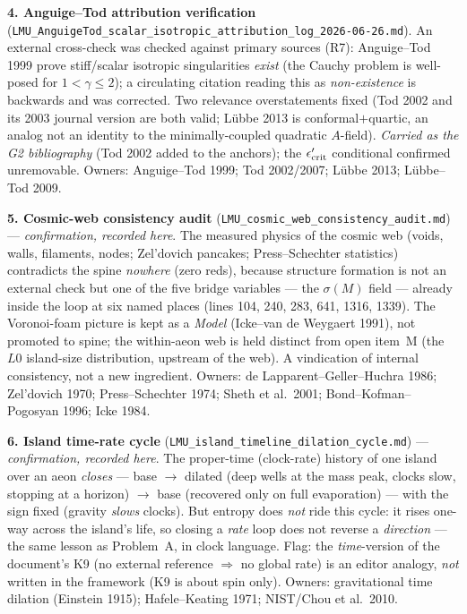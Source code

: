\documentclass[11pt]{article}
\begin{document}
\smallskip\noindent\textbf{4. Anguige--Tod attribution verification} (\texttt{LMU\_AnguigeTod\_scalar\_isotropic\_attribution\_log\_2026-06-26.md}). An external cross-check was checked against primary sources (R7): Anguige--Tod 1999 prove stiff/scalar isotropic singularities \emph{exist} (the Cauchy problem is well-posed for $1<\gamma\le2$); a circulating citation reading this as \emph{non-existence} is backwards and was corrected. Two relevance overstatements fixed (Tod 2002 and its 2003 journal version are both valid; Lübbe 2013 is conformal$+$quartic, an analog not an identity to the minimally-coupled quadratic $A$-field). \emph{Carried as the G2 bibliography} (Tod 2002 added to the anchors); the $\epsilon'_{\rm crit}$ conditional confirmed unremovable. Owners: Anguige--Tod 1999; Tod 2002/2007; Lübbe 2013; Lübbe--Tod 2009.

\smallskip\noindent\textbf{5. Cosmic-web consistency audit} (\texttt{LMU\_cosmic\_web\_consistency\_audit.md}) --- \emph{confirmation, recorded here}. The measured physics of the cosmic web (voids, walls, filaments, nodes; Zel'dovich pancakes; Press--Schechter statistics) contradicts the spine \emph{nowhere} (zero reds), because structure formation is not an external check but one of the five bridge variables --- the $\sigma(M)$ field --- already inside the loop at six named places (lines 104, 240, 283, 641, 1316, 1339). The Voronoi-foam picture is kept as a \emph{Model} (Icke--van de Weygaert 1991), not promoted to spine; the within-aeon web is held distinct from open item~M (the $L0$ island-size distribution, upstream of the web). A vindication of internal consistency, not a new ingredient. Owners: de Lapparent--Geller--Huchra 1986; Zel'dovich 1970; Press--Schechter 1974; Sheth et al.\ 2001; Bond--Kofman--Pogosyan 1996; Icke 1984.

\smallskip\noindent\textbf{6. Island time-rate cycle} (\texttt{LMU\_island\_timeline\_dilation\_cycle.md}) --- \emph{confirmation, recorded here}. The proper-time (clock-rate) history of one island over an aeon \emph{closes} --- base $\to$ dilated (deep wells at the mass peak, clocks slow, stopping at a horizon) $\to$ base (recovered only on full evaporation) --- with the sign fixed (gravity \emph{slows} clocks). But entropy does \emph{not} ride this cycle: it rises one-way across the island's life, so closing a \emph{rate} loop does not reverse a \emph{direction} --- the same lesson as Problem~A, in clock language. Flag: the \emph{time}-version of the document's K9 (no external reference $\Rightarrow$ no global rate) is an editor analogy, \emph{not} written in the framework (K9 is about spin only). Owners: gravitational time dilation (Einstein 1915); Hafele--Keating 1971; NIST/Chou et al.\ 2010.
\end{document}
